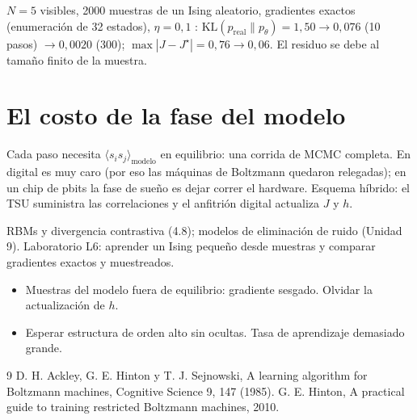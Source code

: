 \documentclass[11pt,a4paper]{article}
\begin{document}
\begin{ejemplo}
$N=5$ visibles, 2000 muestras de un Ising aleatorio, gradientes exactos (enumeración de 32 estados), $\eta=0{,}1$ \evS:
$\mathrm{KL}(p_{\text{real}}\|p_\theta)=1{,}50\to0{,}076$ (10 pasos) $\to0{,}0020$ (300); $\max|J-J^\star|=0{,}76\to0{,}06$. El residuo se debe al
tamaño finito de la muestra.
\end{ejemplo}

\section{El costo de la fase del modelo}
Cada paso necesita $\langle s_is_j\rangle_{\text{modelo}}$ en equilibrio: una corrida de MCMC completa. En digital es muy caro (por eso las máquinas de
Boltzmann quedaron relegadas); en un chip de pbits la fase de sueño es dejar correr el hardware. Esquema híbrido: el TSU suministra las correlaciones y el
anfitrión digital actualiza $J$ y $h$.

\begin{aplicacion}
RBMs y divergencia contrastiva (4.8); modelos de eliminación de ruido (Unidad 9). Laboratorio L6: aprender un Ising pequeño desde muestras y comparar
gradientes exactos y muestreados.
\end{aplicacion}

\begin{error}
\begin{itemize}[nosep]
\item Muestras del modelo fuera de equilibrio: gradiente sesgado. \quad Olvidar la actualización de $h$.
\item Esperar estructura de orden alto sin ocultas. \quad Tasa de aprendizaje demasiado grande.
\end{itemize}
\end{error}

\begin{thebibliography}{9}\small
{} D. H. Ackley, G. E. Hinton y T. J. Sejnowski, A learning algorithm for Boltzmann machines, Cognitive Science 9, 147 (1985).
 G. E. Hinton, A practical guide to training restricted Boltzmann machines, 2010.
\end{thebibliography}
\end{document}

